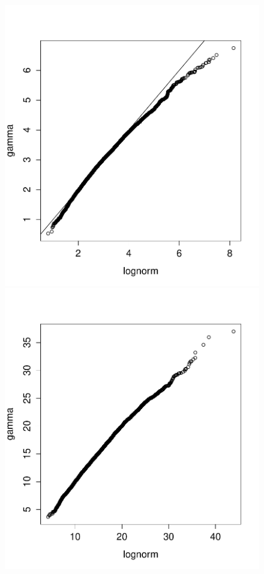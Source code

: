 \documentclass{article}
\begin{document}
\begin{figure}[htb]
	\centering
	\begin{minipage}{.45\textwidth}
		\centering
		\includegraphics[width=0.97\linewidth]{bootstrap-filter/approx03.pdf}
	\end{minipage}
	\begin{minipage}{.45\textwidth}
		\centering
		\includegraphics[width=0.97\linewidth]{bootstrap-filter/approxcoeff5sigma03.pdf}

\end{minipage}
\end{figure}
\end{document}
